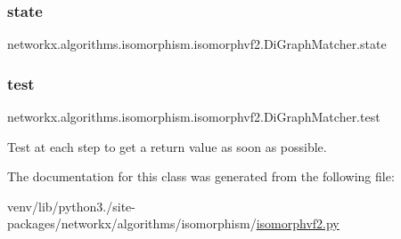 \subsubsection{\texorpdfstring{state}{state}}
{\footnotesize\ttfamily networkx.\+algorithms.\+isomorphism.\+isomorphvf2.\+Di\+Graph\+Matcher.\+state}

\mbox{\label{classnetworkx_1_1algorithms_1_1isomorphism_1_1isomorphvf2_1_1DiGraphMatcher_ac72b34204ff872f87735f458353d565b}} 
\subsubsection{\texorpdfstring{test}{test}}
{\footnotesize\ttfamily networkx.\+algorithms.\+isomorphism.\+isomorphvf2.\+Di\+Graph\+Matcher.\+test}



Test at each step to get a return value as soon as possible. 



The documentation for this class was generated from the following file\+:\begin{DoxyCompactItemize}
\item 
venv/lib/python3./site-\/packages/networkx/algorithms/isomorphism/\hyperlink{isomorphvf2_8py}{isomorphvf2.\+py}\end{DoxyCompactItemize}
